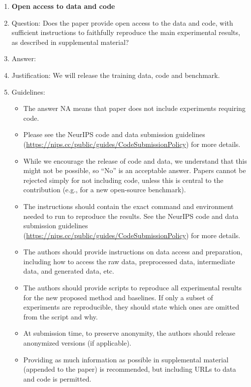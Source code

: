 \documentclass{article}
\theoremstyle{plain}
\theoremstyle{definition}
\theoremstyle{remark}
\begin{document}
\begin{enumerate}
\item {\bf Open access to data and code}
    \item[] Question: Does the paper provide open access to the data and code, with sufficient instructions to faithfully reproduce the main experimental results, as described in supplemental material?
    \item[] Answer: \answerYes{} %
    \item[] Justification: We will release the training data, code and benchmark. 
    \item[] Guidelines:
    \begin{itemize}
        \item The answer NA means that paper does not include experiments requiring code.
        \item Please see the NeurIPS code and data submission guidelines (\url{https://nips.cc/public/guides/CodeSubmissionPolicy}) for more details.
        \item While we encourage the release of code and data, we understand that this might not be possible, so “No” is an acceptable answer. Papers cannot be rejected simply for not including code, unless this is central to the contribution (e.g., for a new open-source benchmark).
        \item The instructions should contain the exact command and environment needed to run to reproduce the results. See the NeurIPS code and data submission guidelines (\url{https://nips.cc/public/guides/CodeSubmissionPolicy}) for more details.
        \item The authors should provide instructions on data access and preparation, including how to access the raw data, preprocessed data, intermediate data, and generated data, etc.
        \item The authors should provide scripts to reproduce all experimental results for the new proposed method and baselines. If only a subset of experiments are reproducible, they should state which ones are omitted from the script and why.
        \item At submission time, to preserve anonymity, the authors should release anonymized versions (if applicable).
        \item Providing as much information as possible in supplemental material (appended to the paper) is recommended, but including URLs to data and code is permitted.
    \end{itemize}



\end{enumerate}
\end{document}
